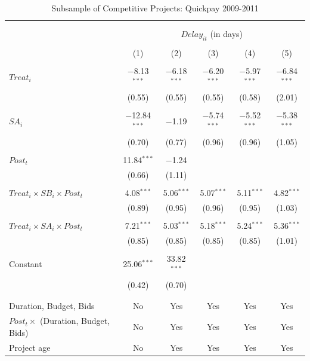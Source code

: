 \documentclass[
]{article}
\begin{document}
\begin{table}[H] \centering 
  \caption{Subsample of Competitive Projects: Quickpay 2009-2011} 
  \label{} 
\small 
\begin{tabular}{@{\extracolsep{-2pt}}lccccc} 
\\[-1.8ex]\hline 
\hline \\[-1.8ex] 
\\[-1.8ex] & \multicolumn{5}{c}{$Delay_{it}$ (in days)} \\ 
\\[-1.8ex] & (1) & (2) & (3) & (4) & (5)\\ 
\hline \\[-1.8ex] 
 $Treat_i$ & $-$8.13$^{***}$ & $-$6.18$^{***}$ & $-$6.20$^{***}$ & $-$5.97$^{***}$ & $-$6.84$^{***}$ \\ 
  & (0.55) & (0.55) & (0.55) & (0.58) & (2.01) \\ 
  & & & & & \\ 
 $SA_i$ & $-$12.84$^{***}$ & $-$1.19 & $-$5.74$^{***}$ & $-$5.52$^{***}$ & $-$5.38$^{***}$ \\ 
  & (0.70) & (0.77) & (0.96) & (0.96) & (1.05) \\ 
  & & & & & \\ 
 $Post_t$ & 11.84$^{***}$ & $-$1.24 &  &  &  \\ 
  & (0.66) & (1.11) &  &  &  \\ 
  & & & & & \\ 
 $Treat_i \times SB_i \times Post_t$ & 4.08$^{***}$ & 5.06$^{***}$ & 5.07$^{***}$ & 5.11$^{***}$ & 4.82$^{***}$ \\ 
  & (0.89) & (0.95) & (0.96) & (0.95) & (1.03) \\ 
  & & & & & \\ 
 $Treat_i \times SA_i \times Post_t$ & 7.21$^{***}$ & 5.03$^{***}$ & 5.18$^{***}$ & 5.24$^{***}$ & 5.36$^{***}$ \\ 
  & (0.85) & (0.85) & (0.85) & (0.85) & (1.01) \\ 
  & & & & & \\ 
 Constant & 25.06$^{***}$ & 33.82$^{***}$ &  &  &  \\ 
  & (0.42) & (0.70) &  &  &  \\ 
  & & & & & \\ 
\hline \\[-1.8ex] 
Duration, Budget, Bids & No & Yes & Yes & Yes & Yes \\ 
$Post_t \times $  (Duration, Budget, Bids) & No & Yes & Yes & Yes & Yes \\ 
Project age & No & Yes & Yes & Yes & Yes \\ 

\end{tabular}
\end{table}
\end{document}

